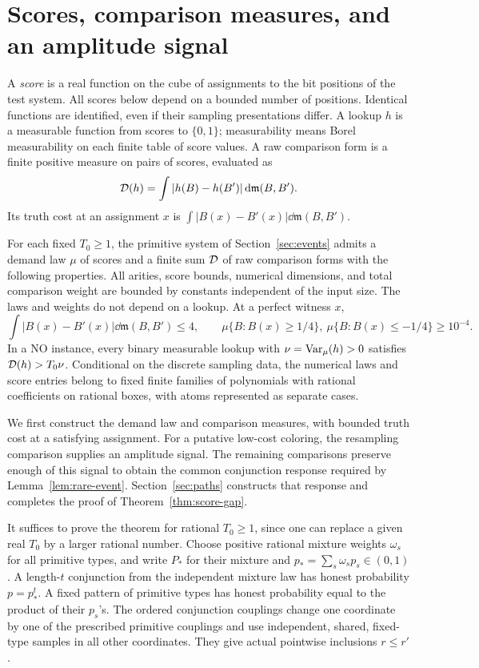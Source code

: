 \section{Scores, comparison measures, and an amplitude signal}
\label{sec:scores}

A \emph{score} is a real function on the cube of assignments to the bit
positions of the test system. All scores below depend on a bounded number
of positions. Identical functions are identified, even if their sampling
presentations differ. A lookup $h$ is a measurable function from scores
to $\{0,1\}$; measurability means Borel measurability on each finite table
of score values. A raw comparison form is a finite positive measure on
pairs of scores, evaluated as
\[
 \mathcal D(h)=\int |h(B)-h(B')|\,\mathrm d\mathfrak m(B,B').
\]
Its truth cost at an assignment $x$ is
$\int|B(x)-B'(x)|\dd\mathfrak m(B,B')$.

\begin{theorem}\label{thm:score-gap}
For each fixed $T_0\ge1$, the primitive system of
Section~\ref{sec:events} admits a demand law $\mu$ of scores and a finite
sum $\mathcal D$ of raw comparison forms with the following properties.
All arities, score bounds, numerical dimensions, and total comparison
weight are bounded by constants independent of the input size. The laws
and weights do not depend on a lookup. At a perfect witness $x$,
\[
 \int|B(x)-B'(x)|\dd\mathfrak m(B,B')\le4,
 \qquad
 \mu\{B:B(x)\ge1/4\},\ \mu\{B:B(x)\le-1/4\}\ge10^{-4}.
\]
In a NO instance, every binary measurable lookup with
$\nu=\operatorname{Var}_\mu(h)>0$ satisfies $\mathcal D(h)>T_0\nu$.
Conditional on the discrete sampling data, the numerical laws and score
entries belong to fixed finite families of polynomials with rational
coefficients on rational boxes, with atoms represented as separate cases.
\end{theorem}

We first construct the demand law and comparison measures, with bounded
truth cost at a satisfying assignment. For a putative low-cost coloring,
the resampling comparison supplies an amplitude signal. The remaining
comparisons preserve enough of this signal to obtain the common
conjunction response required by Lemma~\ref{lem:rare-event}.
Section~\ref{sec:paths} constructs that response and completes the proof
of Theorem~\ref{thm:score-gap}.

It suffices to prove the theorem for rational $T_0\ge1$, since one can
replace a given real $T_0$ by a larger rational number. Choose positive
rational mixture weights $\omega_s$ for all primitive types, and write
$P_*$ for their mixture and $p_*=\sum_s\omega_sp_s\in(0,1)$.
A length-$t$ conjunction from the independent mixture law has honest
probability $p=p_*^t$. A fixed pattern of primitive types has honest
probability equal to the product of their $p_s$'s. The ordered conjunction
couplings change one coordinate by one of the prescribed primitive
couplings and use independent, shared, fixed-type samples in all other
coordinates. They give actual pointwise inclusions $r\le r'$.

